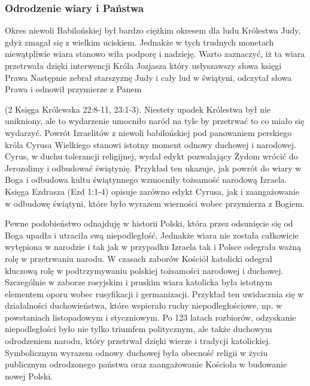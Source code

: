 \subsubsection{Odrodzenie wiary i Państwa}

Okres niewoli Babilońskiej był bardzo ciężkim okresem dla ludu Królestwa Judy,
gdyż zmagał się z wielkim uciskiem. Jednakże w tych trudnych monetach niewątpliwie
wiara stanowo wiła podporę i nadzieję. Warto zaznaczyć, iż ta wiara przetrwała dzięki
interwencji Króla Jozjasza który usłyszawszy słowa księgi Prawa Następnie zebrał
starszyznę Judy i cały lud w świątyni, odczytał słowa Prawa i odnowił przymierze z Panem

(2 Księga Królewska 22:8-11, 23:1-3). Niestety upadek Królestwa był nie unikniony, ale to
wydarzenie umocniło naród na tyle by przetrwać to co miało się wydarzyć. Powrót
Izraelitów z niewoli babilońskiej pod panowaniem perskiego króla Cyrusa Wielkiego
stanowi istotny moment odnowy duchowej i narodowej. Cyrus, w duchu tolerancji
religijnej, wydał edykt pozwalający Żydom wrócić do Jerozolimy i odbudować świątynię.
Przykład ten ukazuje, jak powrót do wiary w Boga i odbudowa kultu świątynnego wzmocniły
tożsamość narodową Izraela. Księga Ezdrasza (Ezd 1:1-4) opisuje zarówno edykt Cyrusa,
jak i zaangażowanie w odbudowę świątyni, które było wyrazem wierności wobec
przymierza z Bogiem.

Pewne podobieństwo odnajduję w historii Polski, która przez odsunięcie się od
Boga upadła i utraciła swą niepodległość. Jednakże wiara nie została całkowicie wytępiona
w narodzie i tak jak w przypadku Izraela tak i Polsce odegrała ważną rolę w przetrwaniu
narodu. W czasach zaborów Kościół katolicki odegrał kluczową rolę w podtrzymywaniu
polskiej tożsamości narodowej i duchowej. Szczególnie w zaborze rosyjskim i pruskim
wiara katolicka była istotnym elementem oporu wobec rusyfikacji i germanizacji. Przykład
ten uwidacznia się w działalności duchowieństwa, które wspierało ruchy
niepodległościowe, np. w powstaniach listopadowym i styczniowym. Po 123 latach
rozbiorów, odzyskanie niepodległości było nie tylko triumfem politycznym, ale także
duchowym odrodzeniem narodu, który przetrwał dzięki wierze i tradycji katolickiej.
Symbolicznym wyrazem odnowy duchowej była obecność religii w życiu publicznym
odrodzonego państwa oraz zaangażowanie Kościoła w budowanie nowej Polski.


